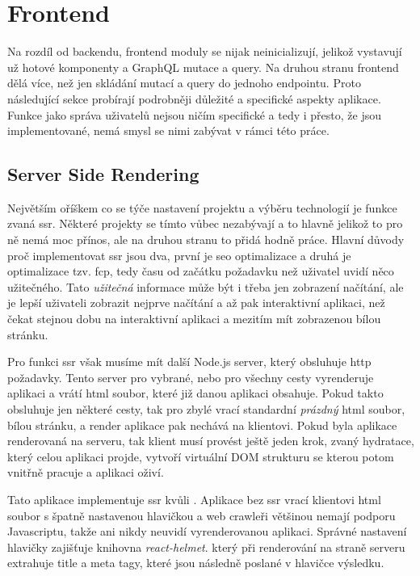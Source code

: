 \section{Frontend}
\label{sc:frontend}
Na rozdíl od backendu, frontend moduly se nijak neinicializují, jelikož vystavují už hotové komponenty a GraphQL mutace a query. Na druhou stranu frontend dělá více, než jen skládání mutací a query do jednoho endpointu. Proto následující sekce probírají podrobněji důležité a specifické aspekty aplikace. Funkce jako správa uživatelů nejsou ničím specifické a tedy i přesto, že jsou implementované, nemá smysl se nimi zabývat v rámci této práce.

\subsection{Server Side Rendering}
\label{ss:ssr}
Největším oříškem co se týče nastavení projektu a výběru technologií je funkce zvaná \acrfull{ssr}. Některé projekty se tímto vůbec nezabývají a to hlavně jelikož to pro ně nemá moc přínos, ale na druhou stranu to přidá hodně práce. Hlavní důvody proč implementovat \acrshort{ssr} jsou dva, první je \acrshort{seo} optimalizace a druhá je optimalizace tzv. \acrfull{fcp}, tedy času od začátku požadavku než uživatel uvidí něco užitečného. Tato \emph{užitečná} informace může být i třeba jen zobrazení načítání, ale je lepší uživateli zobrazit nejprve načítání a až pak interaktivní aplikaci, než čekat stejnou dobu na interaktivní aplikaci a mezitím mít zobrazenou bílou stránku.

Pro funkci \acrshort{ssr} však musíme mít další Node.js server, který obsluhuje http požadavky. Tento server pro vybrané, nebo pro všechny cesty vyrenderuje aplikaci a vrátí html soubor, které již danou aplikaci obsahuje. Pokud takto obsluhuje jen některé cesty, tak pro zbylé vrací standardní \emph{prázdný} html soubor, bílou stránku, a render aplikace pak nechává na klientovi. Pokud byla aplikace renderovaná na serveru, tak klient musí provést ještě jeden krok, zvaný hydratace, který celou aplikaci projde, vytvoří virtuální DOM strukturu se kterou potom vnitřně pracuje a aplikaci oživí.

Tato aplikace implementuje \acrshort{ssr} kvůli . Aplikace bez \acrshort{ssr} vrací klientovi html soubor s špatně nastavenou hlavičkou a web crawleři většinou nemají podporu Javascriptu, takže ani nikdy neuvidí vyrenderovanou aplikaci. Správné nastavení hlavičky zajišťuje knihovna \emph{react-helmet}. který při renderování na straně serveru extrahuje title a meta tagy, které jsou následně poslané v hlavičce výsledku.

